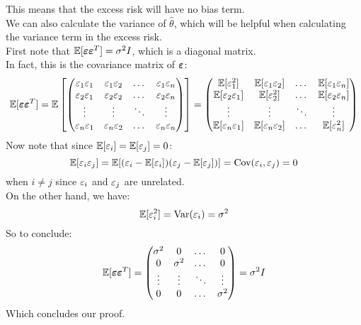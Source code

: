 \documentclass[12pt]{article}
\begin{document}
This means that the excess risk will have no bias
term. \\

We can also calculate the variance
of $\hat{\theta}$, which will be helpful
when calculating the variance term in the 
excess risk. \\

First note that $\mathbb{E}[\boldsymbol{\varepsilon} \boldsymbol{\varepsilon}^T]
= \sigma^2I$, which is a diagonal matrix. \\
In fact, this is the covariance
matrix of $\boldsymbol{\varepsilon}$:
\[ \mathbb{E}[\boldsymbol{\varepsilon} \boldsymbol{\varepsilon}^T]
= \mathbb{E}\left[ \begin{pmatrix} \varepsilon_1\varepsilon_1 & \varepsilon_1\varepsilon_2 & \dots 
& \varepsilon_1\varepsilon_n \\ 
\varepsilon_2\varepsilon_1 & \varepsilon_2\varepsilon_2 & \dots & \varepsilon_2\varepsilon_n \\ 
\vdots &\vdots &\ddots & \vdots \\
\varepsilon_n\varepsilon_1 & \varepsilon_n\varepsilon_2 & \dots 
& \varepsilon_n\varepsilon_n  \end{pmatrix} \right]
= \begin{pmatrix} \mathbb{E}[\varepsilon_1^2] & \mathbb{E}[\varepsilon_1\varepsilon_2] 
& \dots & \mathbb{E}[\varepsilon_1\varepsilon_n] \\ 
\mathbb{E}[\varepsilon_2\varepsilon_1] & \mathbb{E}[\varepsilon_2^2] & 
\dots & \mathbb{E}[\varepsilon_2\varepsilon_n] \\ 
\vdots &\vdots &\ddots & \vdots \\
\mathbb{E}[\varepsilon_n\varepsilon_1] & \mathbb{E}[\varepsilon_n\varepsilon_2] & \dots & 
\mathbb{E}[\varepsilon_n^2]  \end{pmatrix} \]
Now note that since 
$\mathbb{E}[\varepsilon_i] = \mathbb{E}[\varepsilon_j] = 0$:
\[ \mathbb{E}[\varepsilon_i\varepsilon_j] = \mathbb{E}[(\varepsilon_i - \mathbb{E}[\varepsilon_i])
(\varepsilon_j - \mathbb{E}[\varepsilon_j])] = \text{Cov}(\varepsilon_i, \varepsilon_j) = 0 \]
when $i \neq j$ since $\varepsilon_i$ and $\varepsilon_j$
are unrelated. \\
On the other hand, we have:
\[ \mathbb{E}[\varepsilon_i^2] = \text{Var}(\varepsilon_i) = \sigma^2 \]
So to conclude:
\[ \mathbb{E}[\boldsymbol{\varepsilon} \boldsymbol{\varepsilon}^T] 
= \begin{pmatrix} \sigma^2 & 0 & \dots & 0 \\ 
0 & \sigma^2 & \dots & 0 \\ 
\vdots &\vdots &\ddots & \vdots \\
0 & 0 & \dots & \sigma^2  \end{pmatrix} = \sigma^2I \]
Which concludes our proof. \\
\end{document}
